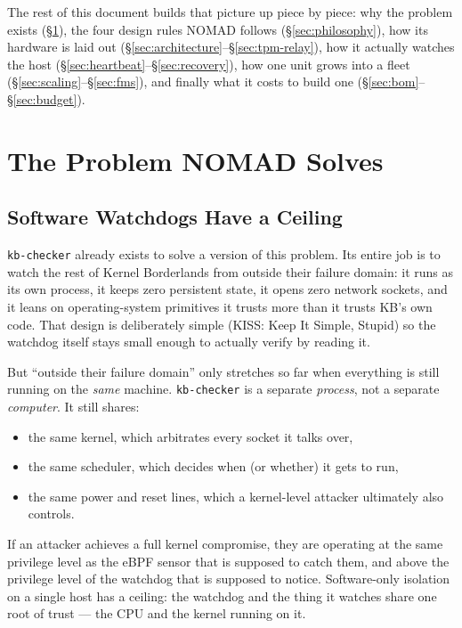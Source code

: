 \documentclass[11pt,a4paper]{article}
\begin{document}
The rest of this document builds that picture up piece by piece: why
the problem exists (\S\ref{sec:problem}), the four design rules NOMAD
follows (\S\ref{sec:philosophy}), how its hardware is laid out
(\S\ref{sec:architecture}--\S\ref{sec:tpm-relay}), how it actually
watches the host (\S\ref{sec:heartbeat}--\S\ref{sec:recovery}), how one
unit grows into a fleet (\S\ref{sec:scaling}--\S\ref{sec:fms}), and
finally what it costs to build one (\S\ref{sec:bom}--\S\ref{sec:budget}).

\section{The Problem NOMAD Solves}
\label{sec:problem}

\subsection{Software Watchdogs Have a Ceiling}

\texttt{kb-checker} already exists to solve a version of this problem.
Its entire job is to watch the rest of Kernel Borderlands from outside
their failure domain: it runs as its own process, it keeps zero
persistent state, it opens zero network sockets, and it leans on
operating-system primitives it trusts more than it trusts KB's own
code. That design is deliberately simple (KISS: Keep It Simple,
Stupid) so the watchdog itself stays small enough to actually verify by
reading it.

But ``outside their failure domain'' only stretches so far when
everything is still running on the \emph{same} machine. \texttt{kb-checker}
is a separate \emph{process}, not a separate \emph{computer}. It still
shares:

\begin{itemize}
  \item the same kernel, which arbitrates every socket it talks over,
  \item the same scheduler, which decides when (or whether) it gets to
    run,
  \item the same power and reset lines, which a kernel-level attacker
    ultimately also controls.
\end{itemize}

If an attacker achieves a full kernel compromise, they are operating at
the same privilege level as the eBPF sensor that is supposed to catch
them, and above the privilege level of the watchdog that is supposed to
notice. Software-only isolation on a single host has a ceiling: the
watchdog and the thing it watches share one root of trust --- the CPU
and the kernel running on it.
\end{document}
